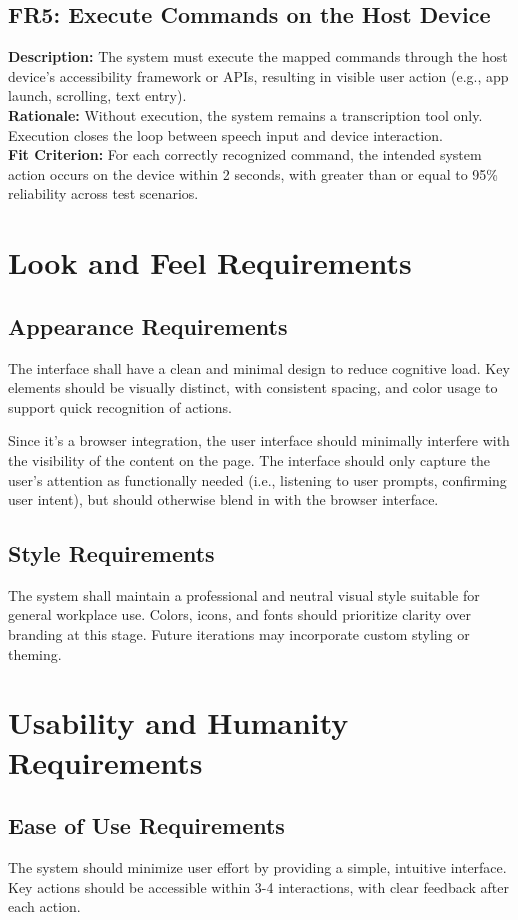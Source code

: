 \documentclass[11pt]{article}
\begin{document}
\subsection{FR5: Execute Commands on the Host Device}
\textbf{Description:} The system must execute the mapped commands through the host device’s accessibility framework or APIs, resulting in visible user action (e.g., app launch, scrolling, text entry).\\
\textbf{Rationale:} Without execution, the system remains a transcription tool only. Execution closes the loop between speech input and device interaction.\\
\textbf{Fit Criterion:} For each correctly recognized command, the intended system action occurs on the device within 2 seconds, with greater than or equal to 95\% reliability across test scenarios.


\section{Look and Feel Requirements}
\subsection{Appearance Requirements}
The interface shall have a clean and minimal design to reduce cognitive load. Key elements should be visually distinct, with consistent spacing, and color usage to support quick recognition of actions.

Since it’s a browser integration, the user interface should minimally interfere with the visibility of the content on the page. The interface should only capture the user’s attention as functionally needed (i.e., listening to user prompts, confirming user intent), but should otherwise blend in with the browser interface.

\subsection{Style Requirements}
The system shall maintain a professional and neutral visual style suitable for general workplace use. Colors, icons, and fonts should prioritize clarity over branding at this stage. Future iterations may incorporate custom styling or theming.


\section{Usability and Humanity Requirements}
\subsection{Ease of Use Requirements}
The system should minimize user effort by providing a simple, intuitive interface. Key actions should be accessible within 3-4 interactions, with clear feedback after each action.
\end{document}
